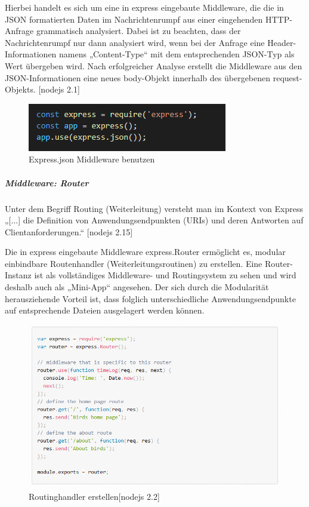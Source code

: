Hierbei handelt es sich um eine in express eingebaute Middleware, die die in JSON formatierten Daten im Nachrichtenrumpf aus einer eingehenden HTTP-Anfrage grammatisch analysiert.  Dabei ist zu beachten, dass der Nachrichtenrumpf nur dann analysiert wird, wenn bei der Anfrage eine Header-Informationen namens „Content-Type“ mit dem entsprechenden JSON-Typ als Wert übergeben wird. Nach erfolgreicher Analyse erstellt die Middleware aus den JSON-Informationen eine neues body-Objekt innerhalb des übergebenen request-Objekts. [nodejs 2.1]
\newline

\begin{figure}[h]
\centering
\includegraphics{images/nodejs_expressJson.PNG}
\caption{Express.json Middleware benutzen}
\end{figure}

\newpage
\subparagraph{Middleware: Router}

Unter dem Begriff Routing (Weiterleitung) versteht man im Kontext von Express „[...] die Definition von Anwendungsendpunkten (URIs) und deren Antworten auf Clientanforderungen.“ [nodejs 2.15]
\newline

Die in express eingebaute Middleware express.Router ermöglicht es, modular einbindbare Routenhandler (Weiterleitungsroutinen) zu erstellen. Eine Router-Instanz ist als vollständiges Middleware- und Routingsystem zu sehen und wird deshalb auch als „Mini-App“ angesehen. Der sich durch die Modularität herausziehende Vorteil ist, dass folglich unterschiedliche Anwendungsendpunkte auf entsprechende Dateien ausgelagert werden können.
\newline

\begin{figure}[h]
\centering
\includegraphics[width=14cm]{images/nodejs_expressRoutererstellen.PNG}
\caption{Routinghandler erstellen[nodejs 2.2]}
\end{figure}

